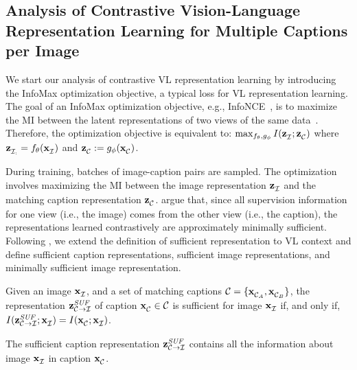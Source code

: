 \subsection{Analysis of Contrastive Vision-Language Representation Learning for Multiple Captions per Image}

 We start our analysis of contrastive \ac{VL} representation learning by introducing the InfoMax optimization objective, a typical loss for \ac{VL} representation learning.
The goal of an InfoMax optimization objective, e.g., InfoNCE~\citep{oord2018representation}, is to maximize the \ac{MI} between the latent representations of two views of the same data~\citep{tschannen2020on}. 
Therefore, the optimization objective is equivalent to: $ \max_{f_{\theta}, g_{\phi} } I (\mathbf{z}_{\mathcal{I}_{}}^{} ; \mathbf{z}_{\mathcal{C}_{}}^{} ) $ where $\mathbf{z}_{\mathcal{I}_{:}}^{}= f_{\theta}(\mathbf{x}_{\mathcal{I}}^{}{})$ and $\mathbf{z}_{\mathcal{C}_{}}^{} := g_{\phi}(\mathbf{x}_{\mathcal{C}_{}}^{})$.


 During training, batches of image-caption pairs are sampled. 
The optimization involves maximizing the \ac{MI} between the image representation $\mathbf{z}_{\mathcal{I}_{}}^{}$ and the matching caption representation $\mathbf{z}_{\mathcal{C}_{}}^{}$.
\cite{wang2022rethinking} argue that, since all supervision information for one view (i.e., the image) comes from the other view (i.e., the caption), the representations learned contrastively are approximately minimally sufficient.
Following \citep{tian2020what, wang2022rethinking}, we extend the definition of sufficient representation to \ac{VL} context and define sufficient caption representations, sufficient image representations, and minimally sufficient image representation.

\begin{definition}
	\label{def:suff_capt_repr}	
	Given an image $\mathbf{x}_{\mathcal{I}}^{}{}$, and a set of matching captions $\mathcal{C} = \{ \mathbf{x}_{\mathcal{C}_{A}}^{}, \mathbf{x}_{\mathcal{C}_{B}}^{} \}$,
	the representation $\mathbf{z}_{\mathcal{C}_{} \rightarrow \mathcal{I}}^{{\textit{SUF}}}$ of caption $\mathbf{x}_{\mathcal{C}_{}}^{} \in \mathcal{C}$ is sufficient for image $\mathbf{x}_{\mathcal{I}}^{}{}$ if, and only if, $I(\mathbf{z}_{\mathcal{C}_{} \rightarrow \mathcal{I}}^{{\textit{SUF}}}; \mathbf{x}_{\mathcal{I}}^{}{} ) = I(\mathbf{x}_{\mathcal{C}_{}}^{}; \mathbf{x}_{\mathcal{I}}^{}{})$.
\end{definition}
The sufficient caption representation $\mathbf{z}_{\mathcal{C}_{} \rightarrow \mathcal{I}}^{{\textit{SUF}}}$ contains all the information about image $\mathbf{x}_{\mathcal{I}}^{}{}$ in caption $\mathbf{x}_{\mathcal{C}_{}}^{}$.
 
